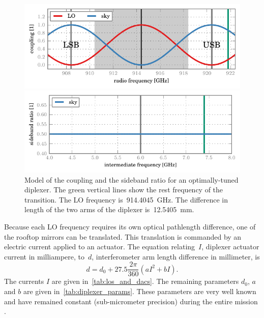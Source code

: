 \begin{figure}
    \centering
    \includegraphics{diplexer_coupling_ideal}
    \caption*{
        Coupling of the mixer to the LO and the sky for an optimally-tuned diplexer.
        The mixer--LO coupling is maximal at the LO frequency
        (black vertical line at~\SI{914.4045}{\giga\hertz}).
        The mixer--sky coupling is maximal at the center of the lower and upper sidebands (gray vertical lines LSB and USB).
    }
    \bigskip
    \includegraphics{diplexer_sbr_ideal}
    \caption*{
        Sideband ratio of the mixer--sky coupling for an optimally-tuned diplexer.
        The constant sideband ratio of \num{0.5} indicates that the LSB and the USB contribute in equal measure to each channel of the spectrum.
    }
    \caption{
        Model of the coupling and the sideband ratio for an optimally-tuned diplexer.
        The green vertical lines show the rest frequency of the  transition.
        The LO frequency is~\SI{914.4045}{\giga\hertz}.
        The difference in length of the two arms of the diplexer is~\SI{12.5405}{\milli\meter}.
    }
    \label{fig:diplexer_ideal}
\end{figure}

Because each LO frequency requires its own optical pathlength difference, 
one of the rooftop mirrors can be translated.
This translation is commanded by an electric current applied to an actuator.
The equation relating~$I$, diplexer actuator current in milliampere, to~$d$, interferometer arm length difference in millimeter, is
\begin{equation}
    d = d_0 + 27.5 \frac{2\pi}{360}(a I^2 + b I)\text{.}
\end{equation}
The currents $I$ are given in~\cref{tab:los_and_dacs}.
The remaining parameters $d_0$, $a$ and $b$ are given in~\cref{tab:diplexer_params}.
These parameters are very well known and have remained constant (sub-micrometer precision) during the entire mission \parencite{mueller2014flight}.

